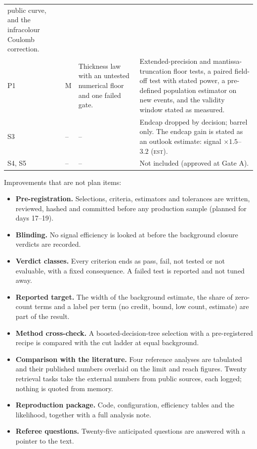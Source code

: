 \documentclass[11pt,a4paper]{article}
\newcommand{\est}{\textsc{est}}
\begin{document}
\begin{longtable}{L{1.0cm}L{0.5cm}L{5.4cm}L{7.6cm}}
     public curve, and the infracolour Coulomb correction. \\
P1 & M & Thickness law with an untested numerical floor and one failed gate.
   & Extended-precision and mantissa-truncation floor tests, a paired field-off test with stated power, a
     pre-defined population estimator on new events, and the validity window stated as measured. \\
S3 & -- & -- & Endcap dropped by decision; barrel only. The endcap gain is stated as an outlook estimate: signal
     $\times1.5$--$3.2$ (\est). \\
S4, S5 & -- & -- & Not included (approved at Gate A). \\
\end{longtable}

\noindent Improvements that are not plan items:
\begin{itemize}
\item \textbf{Pre-registration.} Selections, criteria, estimators and tolerances are written, reviewed, hashed and
      committed before any production sample (planned for days 17--19).
\item \textbf{Blinding.} No signal efficiency is looked at before the background closure verdicts are recorded.
\item \textbf{Verdict classes.} Every criterion ends as pass, fail, not tested or not evaluable, with a fixed
      consequence. A failed test is reported and not tuned away.
\item \textbf{Reported target.} The width of the background estimate, the share of zero-count terms and a label
      per term (no credit, bound, low count, estimate) are part of the result.
\item \textbf{Method cross-check.} A boosted-decision-tree selection with a pre-registered recipe is compared
      with the cut ladder at equal background.
\item \textbf{Comparison with the literature.} Four reference analyses are tabulated and their published numbers
      overlaid on the limit and reach figures. Twenty retrieval tasks take the external numbers from public sources, each logged; nothing is
      quoted from memory.
\item \textbf{Reproduction package.} Code, configuration, efficiency tables and the likelihood, together with a
      full analysis note.
\item \textbf{Referee questions.} Twenty-five anticipated questions are answered with a pointer to the text.
\end{itemize}
\end{document}
